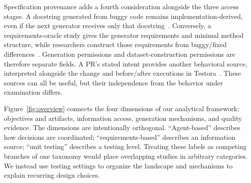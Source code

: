 Specification provenance adds a fourth consideration alongside the three access stages. A docstring generated from buggy code remains implementation-derived, even if the next generator receives only that docstring~\cite{E06}. Conversely, a requirements-oracle study gives the generator requirements and minimal method structure, while researchers construct those requirements from buggy/fixed differences~\cite{O12}. Generation permissions and dataset-construction permissions are therefore separate fields. A PR's stated intent provides another behavioral source, interpreted alongside the change and before/after executions in Testora~\cite{R05}. These sources can all be useful, but their independence from the behavior under examination differs.

Figure~\ref{fig:overview} connects the four dimensions of our analytical framework: objectives and artifacts, information access, generation mechanisms, and quality evidence. The dimensions are intentionally orthogonal. ``Agent-based'' describes how decisions are coordinated; ``requirements-based'' describes an information source; ``unit testing'' describes a testing level. Treating these labels as competing branches of one taxonomy would place overlapping studies in arbitrary categories. We instead use testing settings to organize the landscape and mechanisms to explain recurring design choices.
